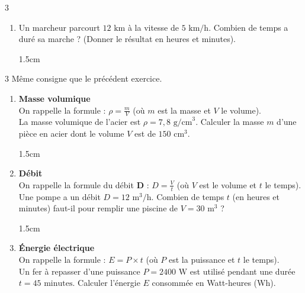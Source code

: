 \documentclass[a4paper]{book}
\begin{document}
{\begin{exerciceNote}{3}
\begin{enumerate}[leftmargin=*]
            \begin{ZoneReponse}{1.5cm}                
            \end{ZoneReponse}

            \item Un marcheur parcourt $12 \text{ km}$ à la vitesse de $5 \text{ km/h}$. Combien de temps a duré sa marche ? (Donner le résultat en heures et minutes).

            \begin{ZoneReponse}{1.5cm}                
            \end{ZoneReponse}
        \end{enumerate}       
    \end{exerciceNote}


    \begin{exerciceNote}{3}
        Même consigne que le précédent exercice.
        \begin{enumerate}[leftmargin=*]
            \item \textbf{Masse volumique} \\
            On rappelle la formule : $\rho = \frac{m}{V}$ (où $m$ est la masse et $V$ le volume). \\
            La masse volumique de l'acier est $\rho = 7,8 \text{ g/cm}^3$. 
            Calculer la masse $m$ d'une pièce en acier dont le volume $V$ est de $150 \text{ cm}^3$.

            \begin{ZoneReponse}{1.5cm}                
            \end{ZoneReponse}
            
            \item \textbf{Débit} \\
            On rappelle la formule du débit \textbf{D} : $D = \frac{V}{t}$ (où $V$ est le volume et $t$ le temps). \\
            Une pompe a un débit $D = 12 \text{ m}^3\text{/h}$. Combien de temps $t$ (en heures et minutes) faut-il pour remplir une piscine de $V = 30 \text{ m}^3$ ?

            \begin{ZoneReponse}{1.5cm}                
            \end{ZoneReponse}

\newpage
            
            \item \textbf{Énergie électrique} \\
            On rappelle la formule : $E = P \times t$ (où $P$ est la puissance et $t$ le temps). \\
            Un fer à repasser d'une puissance $P = 2400 \text{ W}$ est utilisé pendant une durée $t = 45 \text{ minutes}$. 
            Calculer l'énergie $E$ consommée en Watt-heures (Wh).


\end{enumerate}
\end{exerciceNote}}
\end{document}

